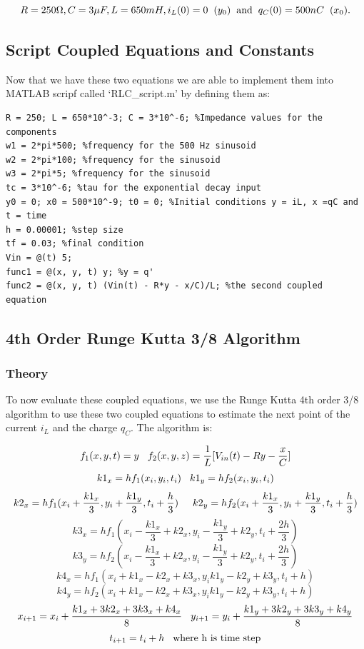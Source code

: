 \documentclass[11pt,a4paper]{article}
\begin{document}
\[R = 250 \Omega, C = 3 \mu F , L = 650 mH, i_L(0) = 0 \hspace{2mm} (y_0) \text{\hspace{2mm}and\hspace{2mm}} q_C(0) = 500nC \hspace{2mm} (x_0).\]

\subsection{Script Coupled Equations and Constants}

Now that we have these two equations we are able to implement them into MATLAB scripf called `RLC\_script.m' by defining them as:

\begin{verbatim}
R = 250; L = 650*10^-3; C = 3*10^-6; %Impedance values for the components
w1 = 2*pi*500; %frequency for the 500 Hz sinusoid
w2 = 2*pi*100; %frequency for the sinusoid
w3 = 2*pi*5; %frequency for the sinusoid
tc = 3*10^-6; %tau for the exponential decay input
y0 = 0; x0 = 500*10^-9; t0 = 0; %Initial conditions y = iL, x =qC and t = time
h = 0.00001; %step size
tf = 0.03; %final condition
Vin = @(t) 5;
func1 = @(x, y, t) y; %y = q'
func2 = @(x, y, t) (Vin(t) - R*y - x/C)/L; %the second coupled equation
\end{verbatim}

\subsection{4th Order Runge Kutta 3/8 Algorithm}
\subsubsection{Theory}

To now evaluate these coupled equations, we use the Runge Kutta 4th order 3/8 algorithm to use these two coupled equations to estimate the next point of the current $i_L$ and the charge $q_C$. The algorithm is:

\[f_1(x,y,t) = y \hspace{3mm} f_2(x,y,z) = \frac{1}{L}[V_{in}(t) - Ry - \frac{x}{C}]\]
\[k1_x = hf_1(x_i,y_i,t_i) \hspace{3mm} k1_y = hf_2(x_i,y_i,t_i)\]
\[k2_x = hf_1(x_i+\frac{k1_x}{3},y_i+\frac{k1_y}{3},t_i+\frac{h}{3}) \hspace{5mm} k2_y = hf_2(x_i+\frac{k1_x}{3},y_i+\frac{k1_y}{3},t_i+\frac{h}{3})\]
\[k3_x = hf_1(x_i-\frac{k1_x}{3}+k2_x,y_i-\frac{k1_y}{3}+k2_y,t_i+\frac{2h}{3}) \]
\[k3_y = hf_2(x_i-\frac{k1_x}{3}+k2_x,y_i-\frac{k1_y}{3}+k2_y,t_i+\frac{2h}{3})\]
\[k4_x = hf_1(x_i+k1_x-k2_x+k3_x,y_ik1_y-k2_y+k3_y,t_i+h) \]
\[k4_y = hf_2(x_i+k1_x-k2_x+k3_x,y_ik1_y-k2_y+k3_y,t_i+h)\]
\[x_{i+1} =x_i+\frac{k1_x+3k2_x+3k3_x+k4_x}{8} \hspace{3mm} y_{i+1} =y_i+\frac{k1_y+3k2_y+3k3_y+k4_y}{8}\]
\[t_{i+1} = t_i + h \hspace{3mm} \text{where h is time step}\]
\end{document}
